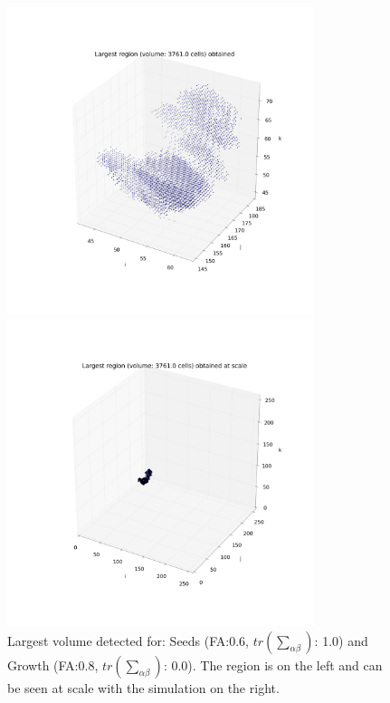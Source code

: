 \documentclass[12pt]{article}
\begin{document}
\begin{figure}[ht]
\centering
\begin{minipage}{.5\textwidth}
  \centering
  \includegraphics[width=0.8\textwidth]{groups/firstimplementation/largest_vol_24_seeds_129.png} %
\end{minipage}%
\begin{minipage}{.5\textwidth}
  \centering
  \includegraphics[width=0.8\textwidth]{groups/firstimplementation/largest_vol_24_seeds_129_scale.png}
  \end{minipage}
\caption{Largest volume detected for: Seeds (FA:0.6, $tr \left(\sum_{\alpha\beta}\right)$: 1.0) and Growth (FA:0.8, $tr \left(\sum_{\alpha\beta}\right)$: 0.0). The region is on the left and can be seen at scale with the simulation on the right.}
\label{fg:first_3D_largest}
\end{figure}
\FloatBarrier
\end{document}

